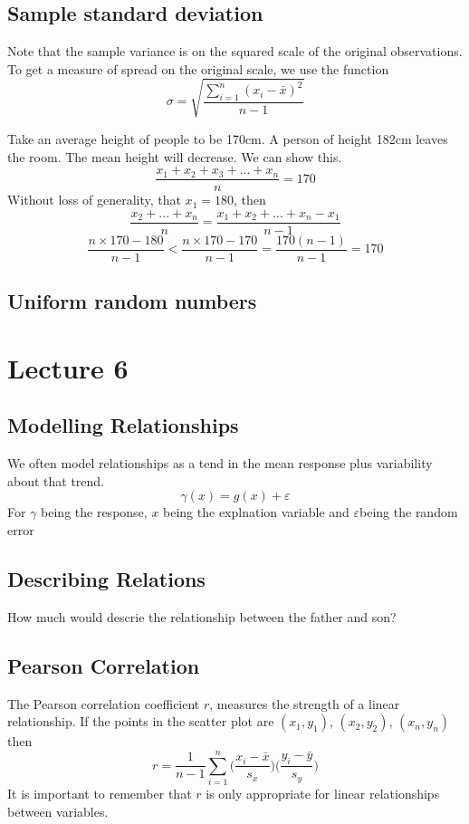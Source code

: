 \documentclass{article}
\theoremstyle{definition}
\theoremstyle{plain}
\theoremstyle{remark}
\begin{document}
\subsection{Sample standard deviation}
Note that the sample variance is on the squared scale of the original observations. To get a measure of spread on the original scale, we use the function
$$ \sigma = \sqrt{ \frac{\sum_{i=1}^n (x_i - \bar{x})^2}{n-1}} $$

Take an average height of people to be 170cm. A person of height 182cm leaves the room. The mean height will decrease. We can show this.
$$ \frac{x_1 + x_2 + x_3 + ... + x_n}{n} = 170 $$ Without loss of generality, that $ x_1 = 180 $, then $$ \frac{x_2 + ... + x_n}{n} = \frac{x_1 + x_2 + ... + x_n - x_1}{n-1}$$
$$ \frac{n \times 170 - 180}{n-1} < \frac{n \times 170 - 170}{n-1} = \frac{170(n-1)}{n-1} = 170 $$
\subsection{Uniform random numbers}

\section{Lecture 6}
\subsection{Modelling Relationships}
We often model relationships as a tend in the mean response plus variability about that trend.
$$ \gamma (x) = g(x) + \varepsilon $$
For $ \gamma $ being the response, $ x $ being the explnation variable and $ \varepsilon  $being the random error
\subsection{Describing Relations}
How much would descrie the relationship between the father and son?

\subsection{Pearson Correlation}
The Pearson correlation coefficient $ r $, measures the strength of a linear relationship. If the points in the scatter plot are $ (x_1, y_1) $, $ (x_2, y_2) $, $ (x_n, y_n) $ then
$$ r = \frac{1}{n-1} \sum_{i=1}^n \Big ( \frac{x_i - \bar{x}}{s_x}\Big) \Big ( \frac{y_i - \bar{y}}{s_y}\Big) $$
It  is important to remember that $ r $ is only appropriate for linear relationships between variables.
\end{document}
